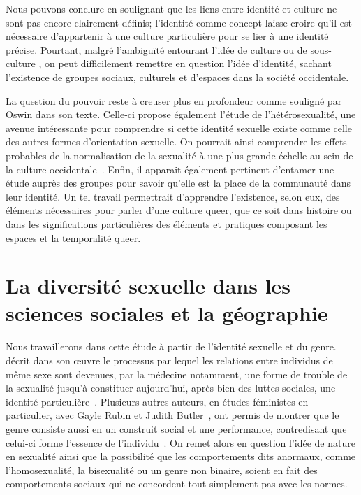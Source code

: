 Nous pouvons conclure en soulignant que les liens entre identité et culture ne sont pas encore clairement définis; l'identité comme concept laisse croire qu'il est nécessaire d'appartenir à une culture particulière pour se lier à une identité précise.
Pourtant, malgré l'ambiguïté entourant l'idée de culture ou de sous-culture \lgbt{}, on peut difficilement remettre en question l'idée d'identité, sachant l'existence de groupes sociaux, culturels et d'espaces \lgbt{} dans la société occidentale.

La question du pouvoir reste à creuser plus en profondeur comme souligné par Oswin dans son texte.
Celle-ci propose également l'étude de l'hétérosexualité, une avenue intéressante pour comprendre si cette identité sexuelle existe comme celle des autres formes d'orientation sexuelle.
On pourrait ainsi comprendre les effets probables de la normalisation de la sexualité à une plus grande échelle au sein de la culture occidentale~\citep[100]{Oswin2008}.
Enfin, il apparait également pertinent d’entamer une étude auprès des groupes \lgbt{} pour savoir qu'elle est la place de la communauté dans leur identité.
Un tel travail permettrait d'apprendre l'existence, selon eux, des éléments nécessaires pour parler d'une culture queer, que ce soit dans histoire ou dans les significations particulières des éléments et pratiques composant les espaces et la temporalité queer.

\section{La diversité sexuelle dans les sciences sociales et la géographie}
\label{ssub:la_diversit_sexuelle_dans_les_sciences_sociales_et_la_g_ographie}
Nous travaillerons dans cette étude à partir de l'identité sexuelle et du genre.
\citet{Foucault2011} décrit dans son œuvre  le processus par lequel les relations entre individus de même sexe sont devenues, par la médecine notamment, une forme de trouble de la sexualité jusqu'à constituer aujourd'hui, après bien des luttes sociales, une identité particulière~\citep{Foucault2011}.
Plusieurs autres auteurs, en études féministes en particulier, avec Gayle Rubin et Judith Butler~\citep[98]{Marcus2005}, ont permis de montrer que le genre consiste aussi en un construit social et une performance, contredisant que celui-ci forme l'essence de l'individu~\citep{Butler2007}.
On remet alors en question l'idée de nature en sexualité ainsi que la possibilité que les comportements dits anormaux, comme l'homosexualité, la bisexualité ou un genre non binaire, soient en fait des comportements sociaux qui ne concordent tout simplement pas avec les normes.


